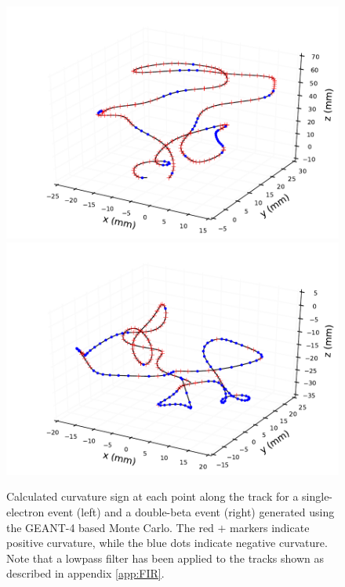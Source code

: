 \documentclass{JINST}
\begin{document}
\begin{figure}[!htb]
	\includegraphics[scale=0.48]{fig/plt_trkcurv_nmagse2_6.pdf}
	\includegraphics[scale=0.48]{fig/plt_trkcurv_nmagbb2_2.pdf}
	\caption{\label{fig_trkcurv}Calculated curvature sign at each point along the track for a single-electron event (left) and a double-beta event (right) generated using the GEANT-4 based Monte Carlo.  The red $+$ markers indicate positive curvature, while the blue dots indicate negative curvature.  Note that a lowpass filter has been applied to the tracks shown as described in appendix \protect\ref{app:FIR}.}
\end{figure}
\end{document}
